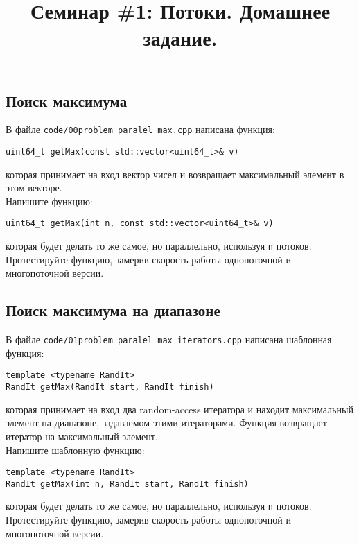 \documentclass{article}
\begin{document}
\title{Семинар \#1: Потоки. Домашнее задание.\vspace{-5ex}}\date{}\maketitle
\subsection{Поиск максимума}
В файле \texttt{code/00problem\_paralel\_max.cpp} написана функция:
\begin{lstlisting}
uint64_t getMax(const std::vector<uint64_t>& v)
\end{lstlisting}
которая принимает на вход вектор чисел и возвращает максимальный элемент в этом векторе.\\
Напишите функцию:
\begin{lstlisting}
uint64_t getMax(int n, const std::vector<uint64_t>& v)
\end{lstlisting}
которая будет делать то же самое, но параллельно, используя \texttt{n} потоков.\\
Протестируйте функцию, замерив скорость работы однопоточной и многопоточной версии.


\subsection{Поиск максимума на диапазоне}
В файле \texttt{code/01problem\_paralel\_max\_iterators.cpp} написана шаблонная функция:
\begin{lstlisting}
template <typename RandIt>
RandIt getMax(RandIt start, RandIt finish)
\end{lstlisting}
которая принимает на вход два random-access итератора и находит максимальный элемент на диапазоне, задаваемом этими итераторами.
Функция возвращает итератор на максимальный элемент.\\
Напишите шаблонную функцию:
\begin{lstlisting}
template <typename RandIt>
RandIt getMax(int n, RandIt start, RandIt finish)
\end{lstlisting}
которая будет делать то же самое, но параллельно, используя \texttt{n} потоков.\\
Протестируйте функцию, замерив скорость работы однопоточной и многопоточной версии.
\end{document}
